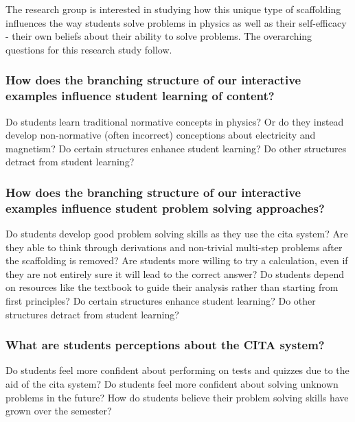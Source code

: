 The research group is interested in studying how this unique type of scaffolding influences the way students solve problems in physics as well as their self-efficacy - their own beliefs about their ability to solve problems. The overarching questions for this research study follow.

\subsubsection{How does the branching structure of our interactive examples influence student learning of content?}

Do students learn traditional normative concepts in physics? Or do they instead develop non-normative (often incorrect) conceptions about electricity and magnetism? Do certain structures enhance student learning? Do other structures detract from student learning?

\subsubsection{How does the branching structure of our interactive examples influence student problem solving approaches?}

Do students develop good problem solving skills as they use the \gls{cita} system? Are they able to think through derivations and non-trivial multi-step problems after the scaffolding is removed? Are students more willing to try a calculation, even if they are not entirely sure it will lead to the correct answer? Do students depend on resources like the textbook to guide their analysis rather than starting from first principles? Do certain structures enhance student learning? Do other structures detract from student learning?

\subsubsection{What are students perceptions about the CITA system?}

Do students feel more confident about performing on tests and quizzes due to the aid of the \gls{cita} system? Do students feel more confident about solving unknown problems in the future? How do students believe their problem solving skills have grown over the semester?
